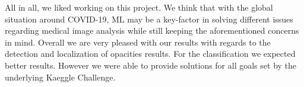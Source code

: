 All in all, we liked working on this project. We think that with the global situation around COVID-19, ML may be a key-factor in solving different issues regarding medical image analysis while still keeping the aforementioned concerns in mind. Overall we are very pleased with our results with regards to the detection and localization of opacities results. For the classification we expected better results. However we were able to provide solutions for all goals set by the underlying Kaeggle Challenge. 
